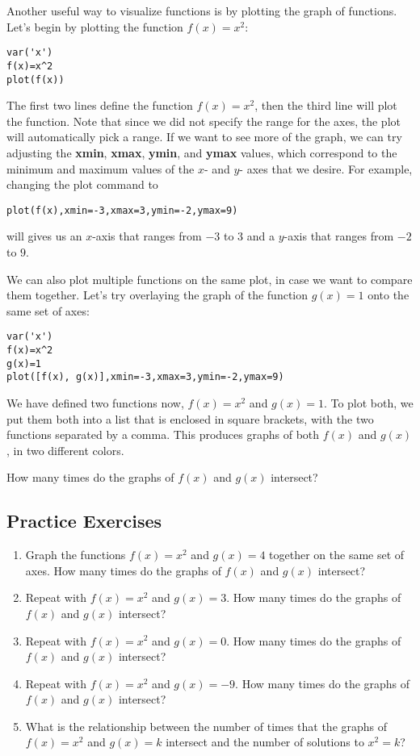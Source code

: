 \documentclass[12pt]{amsart}
\theoremstyle{definition}
\theoremstyle{definition}
\begin{document}
Another useful way to visualize functions is by plotting the graph of
functions. Let's begin by plotting the function $f(x)=x^2$:

\begin{verbatim}
var('x')
f(x)=x^2
plot(f(x))
\end{verbatim}

The first two lines define the function $f(x)=x^2$, then the third line will plot
the function. Note that since we did not specify the range for the axes, the
plot will automatically pick a range. If we want to see more of the graph, we
can try adjusting the \textbf{xmin}, \textbf{xmax}, \textbf{ymin}, and \textbf{ymax}
values, which correspond to the minimum and maximum values of the
$x$- and $y$- axes that we desire. For example, changing the plot
command to

\begin{verbatim}
plot(f(x),xmin=-3,xmax=3,ymin=-2,ymax=9)
\end{verbatim}

will gives us an $x$-axis that ranges from $-3$ to $3$ and a $y$-axis that
ranges from $-2$ to $9$.

We can also plot multiple functions on the same plot, in case we
want to compare them together. Let's try overlaying the graph of
the function $g(x)=1$ onto the same set of axes:

\begin{verbatim}
var('x')
f(x)=x^2
g(x)=1
plot([f(x), g(x)],xmin=-3,xmax=3,ymin=-2,ymax=9)
\end{verbatim}

We have defined two functions now, $f(x)=x^2$ and $g(x)=1$. To
plot both, we put them both into a list that is enclosed in square
brackets, with the two functions separated by a comma. This produces
graphs of both $f(x)$ and $g(x)$, in two different colors.

How many times do the graphs of $f(x)$ and $g(x)$ intersect?

\subsection{Practice Exercises}

\begin{enumerate}
	\item Graph the functions $f(x)=x^2$ and $g(x)=4$ together
		on the same set of axes. How many times do the
		graphs of $f(x)$ and $g(x)$ intersect?
	\item Repeat with $f(x)=x^2$ and $g(x)=3$. How many times do the
		graphs of $f(x)$ and $g(x)$ intersect?
	\item Repeat with $f(x)=x^2$ and $g(x)=0$. How many times do the
		graphs of $f(x)$ and $g(x)$ intersect?
	\item Repeat with $f(x)=x^2$ and $g(x)=-9$. How many times do the
		graphs of $f(x)$ and $g(x)$ intersect?
	\item What is the relationship between the number of times
		that the graphs of $f(x)=x^2$ and $g(x)=k$ intersect and the
		number of solutions to $x^2=k$?
\end{enumerate}
\end{document}
